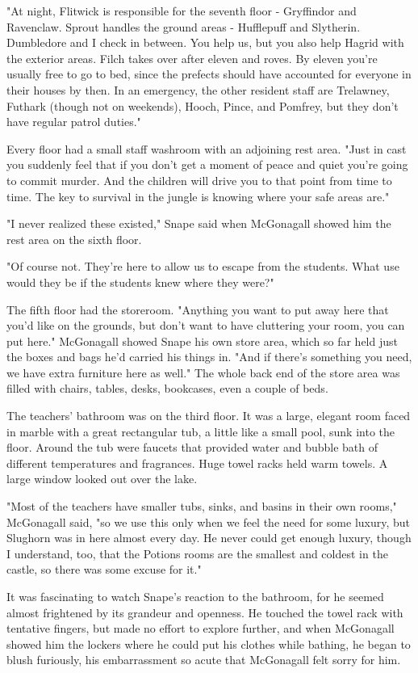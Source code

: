 "At night, Flitwick is responsible for the seventh floor - Gryffindor and Ravenclaw. Sprout handles the ground areas - Hufflepuff and Slytherin. Dumbledore and I check in between. You help us, but you also help Hagrid with the exterior areas. Filch takes over after eleven and roves. By eleven you're usually free to go to bed, since the prefects should have accounted for everyone in their houses by then. In an emergency, the other resident staff are Trelawney, Futhark (though not on weekends), Hooch, Pince, and Pomfrey, but they don't have regular patrol duties."

Every floor had a small staff washroom with an adjoining rest area. "Just in cast you suddenly feel that if you don't get a moment of peace and quiet you're going to commit murder. And the children will drive you to that point from time to time. The key to survival in the jungle is knowing where your safe areas are."

"I never realized these existed," Snape said when McGonagall showed him the rest area on the sixth floor.

"Of course not. They're here to allow us to escape from the students. What use would they be if the students knew where they were?"

The fifth floor had the storeroom. "Anything you want to put away here that you'd like on the grounds, but don't want to have cluttering your room, you can put here." McGonagall showed Snape his own store area, which so far held just the boxes and bags he'd carried his things in. "And if there's something you need, we have extra furniture here as well." The whole back end of the store area was filled with chairs, tables, desks, bookcases, even a couple of beds.

The teachers' bathroom was on the third floor. It was a large, elegant room faced in marble with a great rectangular tub, a little like a small pool, sunk into the floor. Around the tub were faucets that provided water and bubble bath of different temperatures and fragrances. Huge towel racks held warm towels. A large window looked out over the lake.

"Most of the teachers have smaller tubs, sinks, and basins in their own rooms," McGonagall said, "so we use this only when we feel the need for some luxury, but Slughorn was in here almost every day. He never could get enough luxury, though I understand, too, that the Potions rooms are the smallest and coldest in the castle, so there was some excuse for it."

It was fascinating to watch Snape's reaction to the bathroom, for he seemed almost frightened by its grandeur and openness. He touched the towel rack with tentative fingers, but made no effort to explore further, and when McGonagall showed him the lockers where he could put his clothes while bathing, he began to blush furiously, his embarrassment so acute that McGonagall felt sorry for him.

